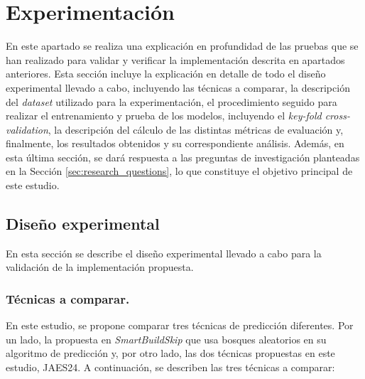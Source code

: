 \section{Experimentación}

En este apartado se realiza una explicación en profundidad de las pruebas que se han realizado
para validar y verificar la implementación descrita en apartados anteriores. Esta sección incluye
la explicación en detalle de todo el diseño experimental llevado a cabo, incluyendo las técnicas
a comparar, la descripción del \textit{dataset} utilizado para la experimentación, el
procedimiento seguido para realizar el entrenamiento y prueba de los modelos, incluyendo el
\textit{key-fold cross-validation}, la descripción del cálculo de las distintas métricas de
evaluación y, finalmente, los resultados obtenidos y su correspondiente análisis. Además, en esta
última sección, se dará respuesta a las preguntas de investigación planteadas en la Sección
\ref{sec:research_questions}, lo que constituye el objetivo principal de este estudio.

\subsection{Diseño experimental}
\noindent En esta sección se describe el diseño experimental llevado a cabo para la validación
de la implementación propuesta.

\subsubsection{Técnicas a comparar.}
En este estudio, se propone comparar tres técnicas de predicción diferentes. Por un lado, la
propuesta en \textit{SmartBuildSkip} \cite{2} que usa bosques aleatorios en su algoritmo de
predicción y, por otro lado, las dos técnicas propuestas en este estudio, JAES24. A continuación,
se describen las tres técnicas a comparar:

